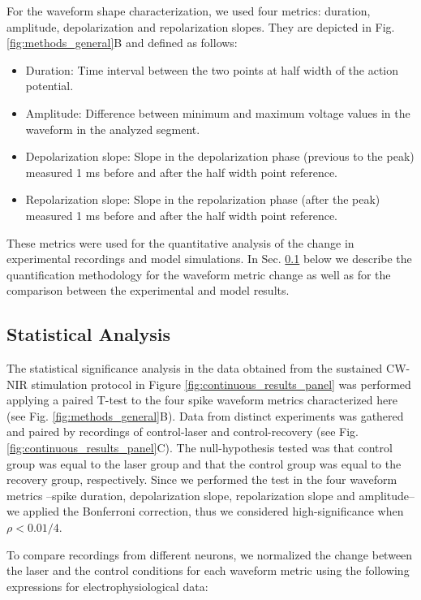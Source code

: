 For the waveform shape characterization, we used four metrics: duration, amplitude, depolarization and repolarization slopes. They are depicted in Fig. \ref{fig:methods_general}B and defined as follows:
\begin{itemize}
	\item Duration: Time interval between the two points at half width of the action potential. 
	\item Amplitude: Difference between minimum and maximum voltage values in the waveform in the analyzed segment. 
	\item Depolarization slope: Slope in the depolarization phase (previous to the peak) measured 1 ms before and after the half width point reference.
	\item Repolarization slope: Slope in the repolarization phase (after the peak) measured 1 ms before and after the half width point reference.
\end{itemize}

These metrics were used for the quantitative analysis of the change in experimental recordings and model simulations. In Sec. \ref{sect:statistical_analysis} below we describe the quantification methodology for the waveform metric change as well as for the comparison between the experimental and model results.



\subsection{Statistical Analysis}
\label{sect:statistical_analysis}
The statistical significance analysis in the data obtained from the sustained CW-NIR stimulation protocol in Figure \ref{fig:continuous_results_panel} was performed applying a paired T-test to the four spike waveform metrics characterized here (see Fig. \ref{fig:methods_general}B). Data from distinct experiments was gathered and paired by recordings of control-laser and control-recovery (see Fig. \ref{fig:continuous_results_panel}C). The null-hypothesis tested was that control group was equal to the laser group and that the control group was equal to the recovery group, respectively. Since we performed the test in the four waveform metrics --spike duration, depolarization slope, repolarization slope and amplitude-- we applied the Bonferroni correction, thus we considered high-significance when $\rho < 0.01/4$.

To compare recordings from different neurons, we normalized the change between the laser and the control conditions for each waveform metric using the following expressions for electrophysiological data:

